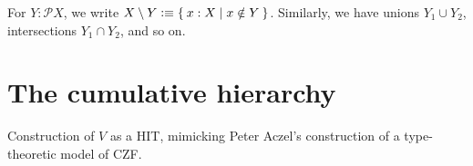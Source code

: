 For $Y:\mathcal{P}X$, we write $X\setminus Y \vcentcolon\equiv \Set{x:X | x\notin Y}$.
Similarly, we have unions $Y_1 \cup Y_2$, intersections $Y_1 \cap Y_2$, and so on.

\section{The cumulative hierarchy}
\label{sec:cumulative-hierarchy}

Construction of $V$ as a HIT, mimicking Peter Aczel's construction of a type-theoretic
model of CZF.




